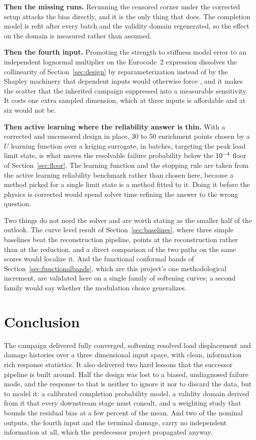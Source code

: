 \documentclass[11pt,a4paper]{article}
\begin{document}
\textbf{Then the \NMissing{} missing runs.} Rerunning the censored corner under the corrected
setup attacks the bias directly, and it is the only thing that does. The completion model is
refit after every batch and the validity domain regenerated, so the effect on the domain is
measured rather than assumed.

\textbf{Then the fourth input.} Promoting the strength to stiffness model error to an
independent lognormal multiplier on the Eurocode~2 expression dissolves the collinearity of
Section~\ref{sec:design} by reparameterization instead of by the Shapley machinery that
dependent inputs would otherwise force \cite{iooss2019}, and it makes the
scatter that the inherited campaign suppressed into a measurable sensitivity. It costs one extra
sampled dimension, which at three inputs is affordable and at six would not be.

\textbf{Then active learning where the reliability answer is thin.} With a corrected and
uncensored design in place, 30 to 50 enrichment points chosen by a $U$ learning function
\cite{echard2011} over a
kriging surrogate, in batches, targeting the peak load limit state, is what moves the resolvable
failure probability below the $10^{-4}$ floor of Section~\ref{sec:floor}. The learning function
and the stopping rule are taken from the active learning reliability benchmark
\cite{moustapha2022} rather than chosen here, because a method picked for a single limit state
is a method fitted to it. Doing it before the
physics is corrected would spend solver time refining the answer to the wrong question.

Two things do not need the solver and are worth stating as the smaller half of the outlook. The
curve level result of Section~\ref{sec:baselines}, where three simple baselines beat the
reconstruction pipeline, points at the reconstruction rather than at the reduction, and a direct
comparison of the two paths on the same scores would localize it. And the functional conformal
bands of Section~\ref{sec:functionalbands}, which are this project's one methodological
increment, are validated here on a single family of softening curves; a second family would say
whether the modulation choice generalizes.

\section{Conclusion}
The campaign delivered \NValid{} fully converged, softening resolved load displacement and damage histories over a three dimensional input space, with clean, information rich response statistics. It also delivered two hard lessons that the successor pipeline is built around. Half the design was lost to a biased, undiagnosed failure mode, and the response to that is neither to ignore it nor to discard the data, but to model it: a calibrated completion probability model, a validity domain derived from it that every downstream stage must consult, and a weighting study that bounds the residual bias at a few percent of the mean. And two of the nominal outputs, the fourth input and the terminal damage, carry no independent information at all, which the predecessor project propagated anyway.
\end{document}

